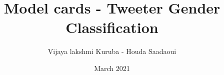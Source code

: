 \documentclass{article}
\title{Model cards - Tweeter Gender Classification}
\author{Vijaya lakshmi Kuruba - Houda Saadaoui}
\date{March 2021}
\begin{document}
 
 \maketitle
 
 
 \newenvironment{mcsection}[1]
     {%
         \textbf{#1}
 
         \begin{itemize}[leftmargin=*,topsep=0pt,itemsep=-1ex,partopsep=1ex,parsep=1ex,after=\vspace{\medskipamount}]
     }
     {%
         \end{itemize}
     }
 
\end{document}
